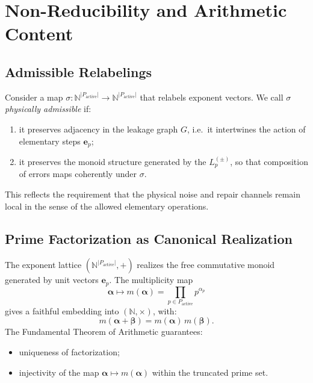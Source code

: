 \documentclass[11pt]{article}
\begin{document}
\section{Non-Reducibility and Arithmetic Content}

\subsection{Admissible Relabelings}

Consider a map $\sigma: \mathbb N^{|P_{\text{active}}|} \to
\mathbb N^{|P_{\text{active}}|}$ that relabels exponent vectors. We call
$\sigma$ \emph{physically admissible} if:
\begin{enumerate}[leftmargin=*]
  \item it preserves adjacency in the leakage graph $G$, i.e.\ it intertwines
        the action of elementary steps $\boldsymbol e_p$;
  \item it preserves the monoid structure generated by the $L_p^{(\pm)}$, so
        that composition of errors maps coherently under $\sigma$.
\end{enumerate}
This reflects the requirement that the physical noise and repair channels
remain local in the sense of the allowed elementary operations.

\subsection{Prime Factorization as Canonical Realization}

The exponent lattice $(\mathbb N^{|P_{\text{active}}|}, +)$ realizes the free
commutative monoid generated by unit vectors $\boldsymbol e_p$. The
multiplicity map
\begin{equation}
  \boldsymbol\alpha \mapsto m(\boldsymbol\alpha)
  = \prod_{p \in P_{\text{active}}} p^{\alpha_p}
\end{equation}
gives a faithful embedding into $(\mathbb N, \times)$, with:
\begin{equation}
  m(\boldsymbol\alpha + \boldsymbol\beta)
  = m(\boldsymbol\alpha)\,m(\boldsymbol\beta).
\end{equation}
The Fundamental Theorem of Arithmetic guarantees:
\begin{itemize}[leftmargin=*]
  \item uniqueness of factorization;
  \item injectivity of the map $\boldsymbol\alpha \mapsto m(\boldsymbol\alpha)$
        within the truncated prime set.
\end{itemize}
\end{document}
